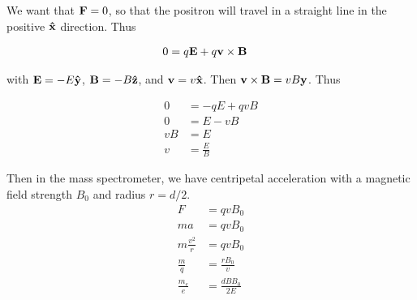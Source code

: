 We want that $\mathbf{F} = 0$, so that the positron will travel in a straight line in the positive $\mathbf{\hat{x}}$ direction. Thus

\begin{align*}
	0 &= q\mathbf{E} + q\mathbf{v}\times\mathbf{B}
\end{align*}

with $\mathbf{E} = -E\mathbf{\hat{y}}$, $\mathbf{B} = -B\mathbf{\hat{z}}$, and $\mathbf{v} = v\mathbf{\hat{x}}$. Then $\mathbf{v}\times\mathbf{B} = vB\mathbf{y}$. Thus

\begin{align*}
	0 &= -qE + qvB\\
	0 &= E - vB \\
	vB &= E\\
	v &= \frac{E}{B}
\end{align*}

Then in the mass spectrometer, we have centripetal acceleration with a magnetic field strength $B_0$ and radius $r = d/2$.
\begin{align*}
	F &= qvB_0\\
	m a &= qvB_0\\
	m \frac{v^2}{r} &= qvB_0\\
	\frac{m}{q} &= \frac{rB_0}{v}\\
	\frac{m_e}{e} &= \frac{dBB_0}{2E}
\end{align*}
